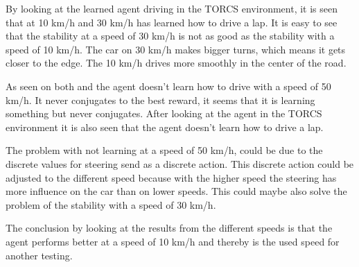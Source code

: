 By looking at the learned agent driving in the TORCS environment, it is seen that at 10 km/h and 30 km/h has learned how to drive a lap. It is easy to see that the stability at a speed of 30 km/h is not as good as the stability with a speed of 10 km/h. The car on 30 km/h makes bigger turns, which means it gets closer to the edge. The 10 km/h drives more smoothly in the center of the road.

As seen on both  and  the agent doesn't learn how to drive with a speed of 50 km/h. It never conjugates to the best reward, it seems that it is learning something but never conjugates. After looking at the agent in the TORCS environment it is also seen that the agent doesn’t learn how to drive a lap.

The problem with not learning at a speed of 50 km/h, could be due to the discrete values for steering send as a discrete action. This discrete action could be adjusted to the different speed because with the higher speed the steering has more influence on the car than on lower speeds. This could maybe also solve the problem of the stability with a speed of 30 km/h. 

The conclusion by looking at the results from the different speeds is that the agent performs better at a speed of 10 km/h and thereby is the used speed for another testing.

    